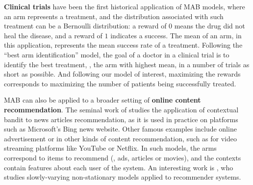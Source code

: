 \textbf{Clinical trials} have been the first historical application of MAB models, where an arm represents a treatment, and the distribution associated with such treatment can be a Bernoulli distribution: a reward of $0$ means the drug did not heal the disease, and a reward of $1$ indicates a success. The mean of an arm, in this application, represents the mean success rate of a treatment.
Following the ``best arm identification'' model, the goal of a doctor in a clinical trial is to identify the best treatment, \ie, the arm with highest mean, in a number of trials as short as possible.
And following our model of interest, maximizing the rewards corresponds to maximizing the number of patients being successfully treated.
%

%

    MAB can also be applied to a broader setting of \textbf{online content recommendation}.
    The seminal work of \cite{Li10} studies the application of contextual bandit to news articles recommendation, as it is used in practice on platforms such as Microsoft's Bing news website.
    Other famous examples include online advertisement or in other kinds of content recommendation, such as for video streaming platforms like YouTube or Netflix.
    In such models, the arms correspond to items to recommend (\eg, ads, articles or movies), and the contexts contain features about each user of the system.
    An interesting work is \cite{Louedec16}, who studies slowly-varying non-stationary models applied to recommender systems.

